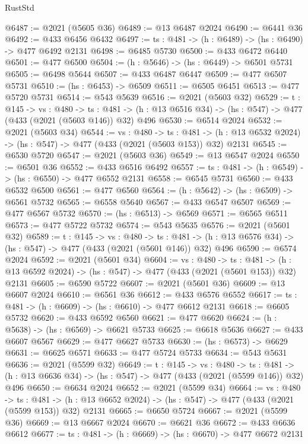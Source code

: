 \begin{lexlean}{RustStd}
\begin{coremodule}
{\begin{coremodule}
{{{{{{{{{{{{{{{{@6487 := @2021 (@5605 @36)
@6489 := @13 @6487 @2024
@6490 := @6441 @36
@6492 := @433 @6456 @6432
@6497 := {ts : @481} -> (h : @6489) -> (hs : @6490) -> @477 @6492 @2131
@6498 := @6485 @5730
@6500 := @433 @6472 @6440
@6501 := @477 @6500
@6504 := (h : @5646) -> (hs : @6449) -> @6501 @5731
@6505 := @6498 @5644
@6507 := @433 @6487 @6447
@6509 := @477 @6507 @5731
@6510 := (hs : @6453) -> @6509
@6511 := @6505 @6451
@6513 := @477 @5720 @5731
@6514 := @543 @5639
@6516 := @2021 (@5603 @32)
@6529 := {t : @145} ->
  {vs : @480} ->
  {ts : @481} -> (h : @13 @6516 @34) -> (hs : @547) -> @477 (@433 (@2021 (@5603 @146)) @32) @496
@6530 := @6514 @2024
@6532 := @2021 (@5603 @34)
@6544 := {vs : @480} ->
  {ts : @481} -> (h : @13 @6532 @2024) -> (hs : @547) -> @477 (@433 (@2021 (@5603 @153)) @32) @2131
@6545 := @6530 @5720
@6547 := @2021 (@5603 @36)
@6549 := @13 @6547 @2024
@6550 := @6501 @36
@6552 := @433 @6516 @6492
@6557 := {ts : @481} -> (h : @6549) -> (hs : @6550) -> @477 @6552 @2131
@6558 := @6545 @5731
@6560 := @433 @6532 @6500
@6561 := @477 @6560
@6564 := (h : @5642) -> (hs : @6509) -> @6561 @5732
@6565 := @6558 @5640
@6567 := @433 @6547 @6507
@6569 := @477 @6567 @5732
@6570 := (hs : @6513) -> @6569
@6571 := @6565 @6511
@6573 := @477 @5722 @5732
@6574 := @543 @5635
@6576 := @2021 (@5601 @32)
@6589 := {t : @145} ->
  {vs : @480} ->
  {ts : @481} -> (h : @13 @6576 @34) -> (hs : @547) -> @477 (@433 (@2021 (@5601 @146)) @32) @496
@6590 := @6574 @2024
@6592 := @2021 (@5601 @34)
@6604 := {vs : @480} ->
  {ts : @481} -> (h : @13 @6592 @2024) -> (hs : @547) -> @477 (@433 (@2021 (@5601 @153)) @32) @2131
@6605 := @6590 @5722
@6607 := @2021 (@5601 @36)
@6609 := @13 @6607 @2024
@6610 := @6561 @36
@6612 := @433 @6576 @6552
@6617 := {ts : @481} -> (h : @6609) -> (hs : @6610) -> @477 @6612 @2131
@6618 := @6605 @5732
@6620 := @433 @6592 @6560
@6621 := @477 @6620
@6624 := (h : @5638) -> (hs : @6569) -> @6621 @5733
@6625 := @6618 @5636
@6627 := @433 @6607 @6567
@6629 := @477 @6627 @5733
@6630 := (hs : @6573) -> @6629
@6631 := @6625 @6571
@6633 := @477 @5724 @5733
@6634 := @543 @5631
@6636 := @2021 (@5599 @32)
@6649 := {t : @145} ->
  {vs : @480} ->
  {ts : @481} -> (h : @13 @6636 @34) -> (hs : @547) -> @477 (@433 (@2021 (@5599 @146)) @32) @496
@6650 := @6634 @2024
@6652 := @2021 (@5599 @34)
@6664 := {vs : @480} ->
  {ts : @481} -> (h : @13 @6652 @2024) -> (hs : @547) -> @477 (@433 (@2021 (@5599 @153)) @32) @2131
@6665 := @6650 @5724
@6667 := @2021 (@5599 @36)
@6669 := @13 @6667 @2024
@6670 := @6621 @36
@6672 := @433 @6636 @6612
@6677 := {ts : @481} -> (h : @6669) -> (hs : @6670) -> @477 @6672 @2131
}}}}}}}}}}}}}}}}
\end{coremodule}}
\end{coremodule}
\end{lexlean}
